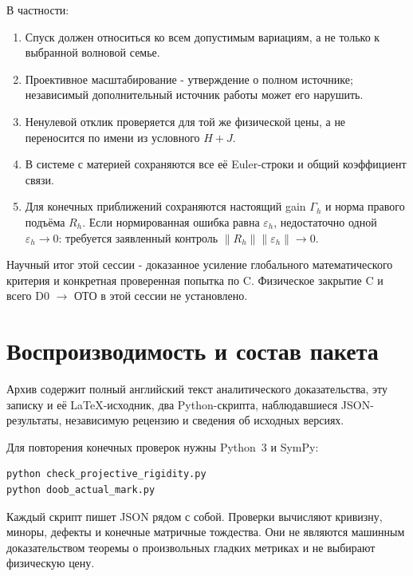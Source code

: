 \documentclass[11pt,a4paper]{article}
\begin{document}
В частности:
\begin{enumerate}
\item Спуск должен относиться ко всем допустимым вариациям, а не только к выбранной волновой семье.
\item Проективное масштабирование - утверждение о полном источнике; независимый дополнительный источник работы может его нарушить.
\item Ненулевой отклик проверяется для той же физической цены, а не переносится по имени из условного $H+J$.
\item В системе с материей сохраняются все её Euler-строки и общий коэффициент связи.
\item Для конечных приближений сохраняются настоящий gain $\Gamma_h$ и норма правого подъёма $R_h$. Если нормированная ошибка равна $\varepsilon_h$, недостаточно одной $\varepsilon_h\to0$: требуется заявленный контроль $\|R_h\|\|\varepsilon_h\|\to0$.
\end{enumerate}

Научный итог этой сессии - доказанное усиление глобального математического критерия и конкретная проверенная попытка по C. Физическое закрытие C и всего D0 $\to$ ОТО в этой сессии не установлено.

\section{Воспроизводимость и состав пакета}
Архив содержит полный английский текст аналитического доказательства, эту записку и её \LaTeX-исходник, два Python-скрипта, наблюдавшиеся JSON-результаты, независимую рецензию и сведения об исходных версиях.

Для повторения конечных проверок нужны Python~3 и SymPy:
\begin{verbatim}
python check_projective_rigidity.py
python doob_actual_mark.py
\end{verbatim}
Каждый скрипт пишет JSON рядом с собой. Проверки вычисляют кривизну, миноры, дефекты и конечные матричные тождества. Они не являются машинным доказательством теоремы о произвольных гладких метриках и не выбирают физическую цену.
\end{document}
